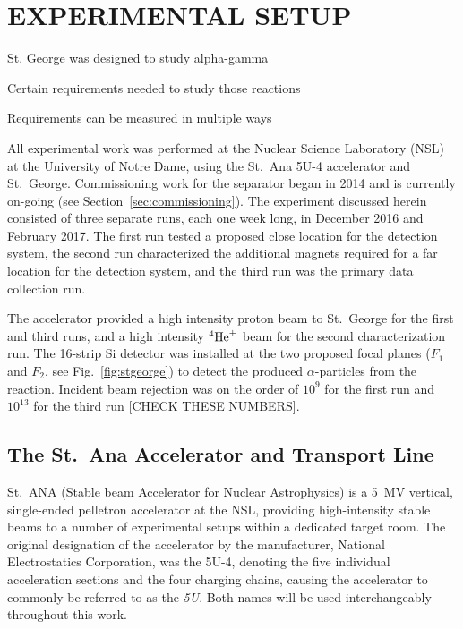 \chapter{EXPERIMENTAL SETUP}
\label{ch:02-experimental-setup}


St. George was designed to study alpha-gamma

Certain requirements needed to study those reactions

Requirements can be measured in multiple ways



All experimental work was performed at the Nuclear Science Laboratory
(NSL) at the University of Notre Dame, using the St.\ Ana 5U-4
accelerator and St.\ George. Commissioning work for the separator began
in 2014 and is currently on-going (see Section~\ref{sec:commissioning}).
The experiment discussed herein consisted of three separate runs, each
one week long, in December 2016 and February 2017. The first run tested
a proposed close location for the detection system, the second run
characterized the additional magnets required for a far location for the
detection system, and the third run was the primary data collection run.

The accelerator provided a high intensity proton beam to St.\ George for
the first and third runs, and a high intensity ${}^{4}\textrm{He}^{+}$ beam
for the second characterization run. The 16-strip Si detector was
installed at the two proposed focal planes ($F_1$ and $F_2$, see
Fig.~\ref{fig:stgeorge}) to detect the produced $\alpha$-particles from
the \alpa{} reaction. Incident beam rejection was on the order of $10^9$
for the first run and $10^{13}$ for the third run [CHECK THESE NUMBERS].


\section{The St.\ Ana Accelerator and Transport Line}
\label{sec:ch02-5U}

St.\ ANA (Stable beam Accelerator for Nuclear Astrophysics) is a 5~MV
vertical, single-ended pelletron accelerator at the NSL, providing
high-intensity stable beams to a number of experimental setups within a
dedicated target room. The original designation of the accelerator by
the manufacturer, National Electrostatics Corporation, was the 5U-4,
denoting the five individual acceleration sections and the four charging
chains, causing the accelerator to commonly be referred to as the
\textit{5U}. Both names will be used interchangeably throughout this
work.


